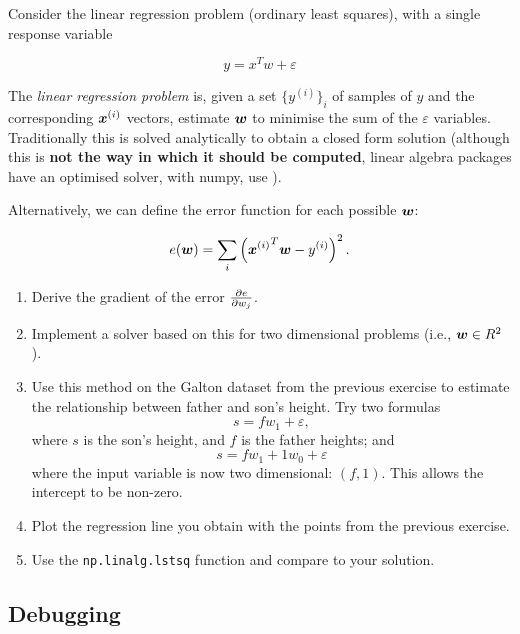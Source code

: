 \begin{exercise}
Consider the linear regression problem (ordinary least squares), with a
single response variable

\[
y = x^T w + \varepsilon
\]

The \emph{linear regression problem} is, given a set $\{ y^{(i)} \}_i$ of
samples of $y$ and the corresponding $\bm{x}^{(i)}$ vectors, estimate
$\bm{w}$ to minimise the sum of the $\varepsilon$ variables. Traditionally
this is solved analytically to obtain a closed form solution (although this is
\textbf{not the way in which it should be computed}, linear algebra packages
have an optimised solver, with numpy, use ).

Alternatively, we can define the error function for each possible $\bm{w}$:

\[
e(\bm{w}) = \sum_i \left( {\bm{x}^{(i)}}^T \bm{w} - y^{(i)} \right)^2.
\]

\begin{enumerate}
\item Derive the gradient of the error $\frac{\partial e}{\partial w_j}$.
\item Implement a solver based on this for two dimensional problems (i.e.,
$\bm{w} \in R^2$).
\item Use this method on the Galton dataset from the previous exercise to
estimate the relationship between father and son's height. Try two formulas
\begin{equation}
s = f w_1 + \varepsilon,
\label{}
\end{equation}
where $s$ is the son's height, and $f$ is the father heights; and
\begin{equation}
s = f w_1 + 1w_0 + \varepsilon
\label{}
\end{equation}
where the input variable is now two dimensional: $(f,1)$. This allows the
intercept to be non-zero.
\item Plot the regression line you obtain with the points from the previous
exercise.
\item Use the \texttt{np.linalg.lstsq} function and compare to your solution.
\end{enumerate}
\end{exercise}

\subsection{Debugging}


